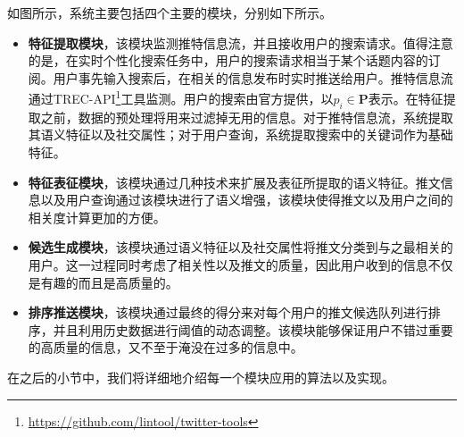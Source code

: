 如图所示，系统主要包括四个主要的模块，分别如下所示。
\begin{itemize}
  \item \textbf{特征提取模块}，该模块监测推特信息流，并且接收用户的搜索请求。值得注意的是，在实时个性化搜索任务中，用户的搜索请求相当于某个话题内容的订阅。用户事先输入搜索后，在相关的信息发布时实时推送给用户。推特信息流通过TREC-API\footnote{\url{https://github.com/lintool/twitter-tools}}工具监测。用户的搜索由官方提供，以$p_i \in \textbf{P}$表示。在特征提取之前，数据的预处理将用来过滤掉无用的信息。对于推特信息流，系统提取其语义特征以及社交属性；对于用户查询，系统提取搜索中的关键词作为基础特征。
  \item \textbf{特征表征模块}，该模块通过几种技术来扩展及表征所提取的语义特征。推文信息以及用户查询通过该模块进行了语义增强，该模块使得推文以及用户之间的相关度计算更加的方便。
  \item \textbf{候选生成模块}，该模块通过语义特征以及社交属性将推文分类到与之最相关的用户。这一过程同时考虑了相关性以及推文的质量，因此用户收到的信息不仅是有趣的而且是高质量的。
  \item \textbf{排序推送模块}，该模块通过最终的得分来对每个用户的推文候选队列进行排序，并且利用历史数据进行阈值的动态调整。该模块能够保证用户不错过重要的高质量的信息，又不至于淹没在过多的信息中。
\end{itemize}

在之后的小节中，我们将详细地介绍每一个模块应用的算法以及实现。

